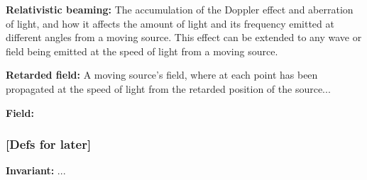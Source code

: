 \noindent \hypertarget{def-relativistic-beaming}{\textbf{Relativistic beaming:}}
The accumulation of the Doppler effect and aberration of light, and how it affects the amount of light and its frequency emitted at different angles from a moving source. This effect can be extended to any wave or field being emitted at the speed of light from a moving source.

\noindent \hypertarget{def-retarded-field}{\textbf{Retarded field:}}
A moving source's field, where at each point has been propagated at the speed of light from the retarded position of the source...

\noindent \hypertarget{def-field}{\textbf{Field:}}


\subsubsection{[Defs for later]}%

\noindent \hypertarget{def-lorentz-invariant}{\textbf{Invariant:}}
...
